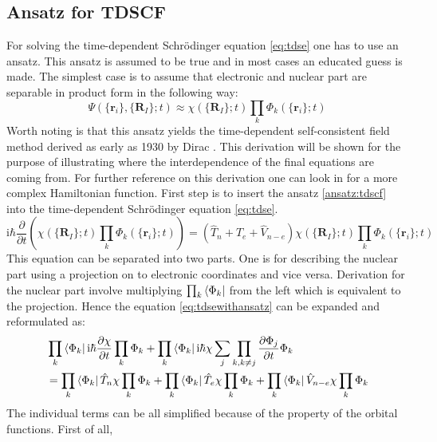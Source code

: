 \documentclass[12pt]{scrartcl}
\begin{document}
\subsection{Ansatz for TDSCF}
For solving the time-dependent Schr\"odinger equation \ref{eq:tdse} one has to use an ansatz. This ansatz is assumed to be true and in most cases an educated guess is made. The simplest case is to assume that electronic and nuclear part are separable in product form in the following way:
\begin{equation}
\Psi( \{ \mathbf{r}_i \}, \{ \mathbf{R}_I \};t) \approx \chi( \{ \mathbf{R}_I \};t) \prod_{k} \Phi_k( \{ \mathbf{r}_i \} ;t)
\label{ansatz:tdscf}
\end{equation}
Worth noting is that this ansatz yields the time-dependent self-consistent field method derived as early as 1930 by Dirac \cite{dirac1930note}. This derivation will be shown for the purpose of illustrating where the interdependence of the final equations are coming from. For further reference on this derivation one can look in \cite{makri1987time} for a more complex Hamiltonian function. First step is to insert the ansatz \ref{ansatz:tdscf} into the time-dependent Schr\"odinger equation \ref{eq:tdse}.
\begin{equation}
\mathrm{i}\hbar \frac{\partial}{\partial t} \left(\chi( \{ \mathbf{R}_I \};t) \prod_{k} \Phi_k( \{ \mathbf{r}_i \} ;t)\right) = \left( \hat{T}_n + \hat{T}_e + \hat{V}_{n-e} \right)\chi( \{ \mathbf{R}_I \};t) \prod_{k} \Phi_k( \{ \mathbf{r}_i \} ;t)
\label{eq:tdsewithansatz}
\end{equation}
This equation can be separated into two parts. One is for describing the nuclear part using a projection on to electronic coordinates and vice versa. Derivation for the nuclear part involve multiplying $\prod_{k} \Bra{\Phi_k}$ from the left which is equivalent to the projection. Hence the equation \ref{eq:tdsewithansatz} can be expanded and reformulated as:
\begin{align*}
&\prod_{k} \Bra{\Phi_k} \mathrm{i}\hbar \frac{\partial \chi}{\partial t} \prod_{k} \Phi_k + \prod_{k} \Bra{\Phi_k} \mathrm{i}\hbar \chi \sum_{j}\prod_{k,k \neq j} \frac{\partial\Phi_j}{\partial t}\Phi_k \\&= \prod_{k} \Bra{\Phi_k} \hat{T}_n \chi \prod_{k} \Phi_k + \prod_{k} \Bra{\Phi_k} \hat{T}_e \chi \prod_{k} \Phi_k + \prod_{k} \Bra{\Phi_k} \hat{V}_{n-e} \chi \prod_{k} \Phi_k
\end{align*}
The individual terms can be all simplified because of the property of the orbital functions. First of all,
\end{document}
